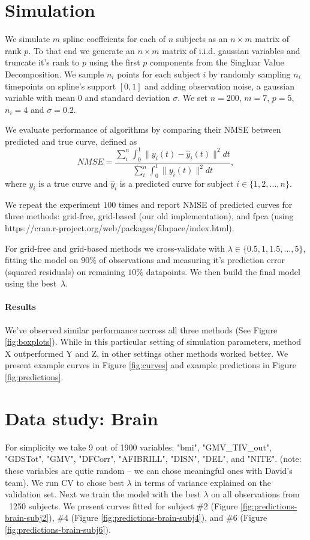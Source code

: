 \documentclass{article}
\begin{document}
\section{Simulation}

We simulate $m$ spline coeffcients for each of $n$ subjects as an $n\times m$ matrix of rank $p$. To that end we generate an $n\times m$ matrix of i.i.d. gaussian variables and truncate it's rank to $p$ using the first $p$ components from the Singluar Value Decomposition. We sample $n_i$ points for each subject $i$ by randomly sampling $n_i$ timepoints on spline's support $[0,1]$ and adding observation noise, a gaussian variable with mean $0$ and standard deviation $\sigma$. We set $n=200$, $m=7$, $p=5$, $n_i = 4$ and $\sigma = 0.2$.

We evaluate performance of algorithms by comparing their NMSE between predicted and true curve, defined as
\[
NMSE = \frac{\sum_i^n \int_0^1 \|y_i(t) - \hat{y}_i(t)\|^2 dt }{ \sum_i^n \int_0^1 \|y_i(t)\|^2 dt},
\]
where $y_i$ is a true curve and $\hat{y}_i$ is a predicted curve for subject $i \in \{1,2,...,n\}$.

We repeat the experiment $100$ times and report NMSE of predicted curves for three methods: grid-free, grid-based (our old implementation), and fpca (using https://cran.r-project.org/web/packages/fdapace/index.html).

For grid-free and grid-based methods we cross-validate with $\lambda \in \{0.5,1,1.5,...,5\}$, fitting the model on $90\%$ of observations and measuring it's prediction error (squared residuals) on remaining $10\%$ datapoints. We then build the final model using the best~$\lambda$.

\paragraph{Results} We've observed similar performance accross all three methods (See Figure \ref{fig:boxplots}). While in this particular setting of simulation parameters, method X outperformed Y and Z, in other settings other methods worked better. We present example curves in Figure \ref{fig:curves} and example predictions in Figure \ref{fig:predictions}.

\section{Data study: Brain}

For simplicity we take 9 out of 1900 variables: "bmi", "GMV\_TIV\_out", "GDSTot", "GMV", "DFCorr", "AFIBRILL", "DISN", "DEL", and "NITE". (note: these variables are qutie random -- we can chose meaningful ones with David's team). We run CV to chose best $\lambda$ in terms of variance explained on the validation set. Next we train the model with the best $\lambda$ on all observations from ~1250 subjects. We present curves fitted for subject \#2 (Figure \ref{fig:predictions-brain-subj2}), \#4 (Figure \ref{fig:predictions-brain-subj4}), and \#6 (Figure \ref{fig:predictions-brain-subj6}).
\end{document}
